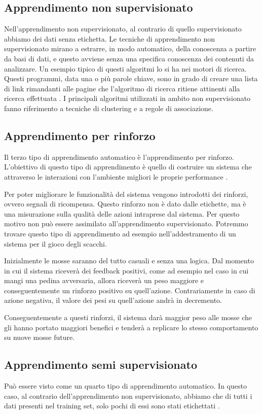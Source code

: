 \documentclass[12pt,italian]{report}
\begin{document}
\subsection{Apprendimento non supervisionato}
Nell’apprendimento non supervisionato, al contrario di quello supervisionato abbiamo dei dati senza etichetta. Le tecniche di apprendimento non supervisionato mirano a estrarre, in modo automatico, della conoscenza a partire da basi di dati, e questo avviene senza una specifica conoscenza dei contenuti da analizzare. Un esempio tipico di questi algoritmi lo si ha nei motori di ricerca. Questi programmi, data una o più parole chiave, sono in grado di creare una lista di link rimandanti alle pagine che l'algoritmo di ricerca ritiene attinenti alla ricerca effettuata \cite{unsupervisedlearning}.
I principali algoritmi utilizzati in ambito non supervisionato fanno riferimento a tecniche di clustering e a regole di associazione.
\subsection{Apprendimento per rinforzo}
Il terzo tipo di apprendimento automatico è l’apprendimento per rinforzo. L’obiettivo di questo tipo di apprendimento è quello di costruire un sistema che attraverso le interazioni con l’ambiente migliori le proprie performance \cite{unsupervisedlearning}.

Per poter migliorare le funzionalità del sistema vengono introdotti dei rinforzi, ovvero segnali di ricompensa. Questo rinforzo non è dato dalle etichette, ma è una misurazione sulla qualità delle azioni intraprese dal sistema. Per questo motivo non può essere assimilato all'apprendimento supervisionato.
Potremmo trovare questo tipo di apprendimento ad esempio nell’addestramento di un sistema per il gioco degli scacchi.

Inizialmente le mosse saranno del tutto casuali e senza una logica. Dal momento in cui il sistema riceverà dei feedback positivi, come ad esempio nel caso in cui mangi una pedina avversaria, allora riceverà un peso maggiore e conseguentemente un rinforzo positivo su quell’azione. Contrariamente in caso di azione negativa, il valore dei pesi su quell’azione andrà in decremento.

Conseguentemente a questi rinforzi, il sistema darà maggior peso alle mosse che gli hanno portato maggiori benefici e tenderà a replicare lo stesso comportamento su nuove mosse future.
\subsection{Apprendimento semi supervisionato}
Può essere visto come un quarto tipo di apprendimento automatico. In questo caso, al contrario dell’apprendimento non supervisionato, abbiamo che di tutti i dati presenti nel training set, solo pochi di essi sono stati etichettati \cite{semisupervised}.
\end{document}
